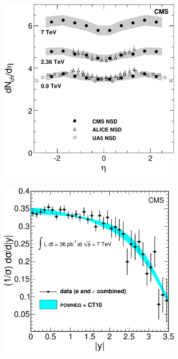 \begin{figure}[!htbp]
    \centering
    \begin{subfigure}[b]{0.99\SideBySidePlotWidth}
    \includegraphics[width=\textwidth]{figures/ExperimentFigures/HadronPseudoRapidityDistribution.pdf}
    \caption{}
     \label{fig:pseudorapidityDistribution}
    \end{subfigure}
    \begin{subfigure}[b]{0.99\SideBySidePlotWidth}
        \includegraphics[width=\textwidth]{figures/ExperimentFigures/ZRapidityDistributionPlot.pdf}

\end{subfigure}
\end{figure}
